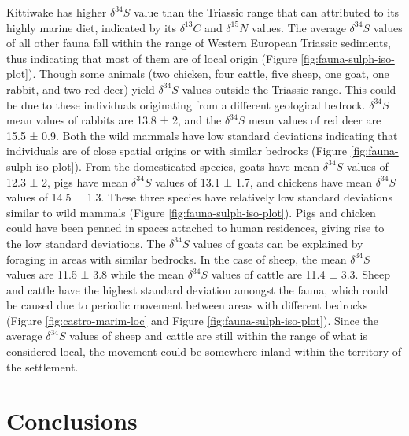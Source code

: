 \documentclass[review]{elsarticle} %
\begin{document}
Kittiwake has higher \(\delta ^{34}S\) value than the Triassic range that can attributed to its highly marine diet, indicated by its \(\delta ^{13}C\) and \(\delta ^{15}N\) values. The average \(\delta ^{34}S\) values of all other fauna fall within the range of Western European Triassic sediments, thus indicating that most of them are of local origin (Figure \ref{fig:fauna-sulph-iso-plot}). Though some animals (two chicken, four cattle, five sheep, one goat, one rabbit, and two red deer) yield \(\delta ^{34}S\) values outside the Triassic range. This could be due to these individuals originating from a different geological bedrock. \(\delta ^{34}S\) mean values of rabbits are 13.8 ± 2\text{\textperthousand}, and the \(\delta ^{34}S\) mean values of red deer are 15.5 ± 0.9\text{\textperthousand}. Both the wild mammals have low standard deviations indicating that individuals are of close spatial origins or with similar bedrocks (Figure \ref{fig:fauna-sulph-iso-plot}). From the domesticated species, goats have mean \(\delta ^{34}S\) values of 12.3 ± 2\text{\textperthousand}, pigs have mean \(\delta ^{34}S\) values of 13.1 ± 1.7\text{\textperthousand}, and chickens have mean \(\delta ^{34}S\) values of 14.5 ± 1.3\text{\textperthousand}. These three species have relatively low standard deviations similar to wild mammals (Figure \ref{fig:fauna-sulph-iso-plot}). Pigs and chicken could have been penned in spaces attached to human residences, giving rise to the low standard deviations. The \(\delta ^{34}S\) values of goats can be explained by foraging in areas with similar bedrocks. In the case of sheep, the mean \(\delta ^{34}S\) values are 11.5 ± 3.8\text{\textperthousand} while the mean \(\delta ^{34}S\) values of cattle are 11.4 ± 3.3\text{\textperthousand}. Sheep and cattle have the highest standard deviation amongst the fauna, which could be caused due to periodic movement between areas with different bedrocks (Figure \ref{fig:castro-marim-loc} and Figure \ref{fig:fauna-sulph-iso-plot}). Since the average \(\delta ^{34}S\) values of sheep and cattle are still within the range of what is considered local, the movement could be somewhere inland within the territory of the settlement.

\hypertarget{conclusions}{%
\section{Conclusions}\label{conclusions}}
\end{document}
